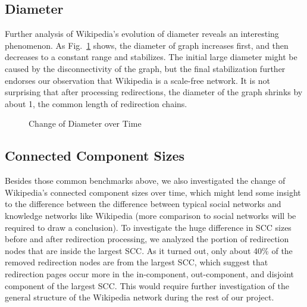 \documentclass[10pt]{article}
\begin{document}
\begin{multicols}{2}
\subsection{Diameter}
Further analysis of Wikipedia's evolution of diameter reveals an interesting phenomenon. As Fig.~\ref{fig:diameter} shows, the diameter of graph increases first, and then decreases to a constant range and stabilizes. The initial large diameter might be caused by the disconnectivity of the graph, but the final stabilization further endorses our observation that Wikipedia is a scale-free network. It is not surprising that after processing redirections, the diameter of the graph shrinks by about 1, the common length of redirection chains.

\begin{figure}[H]
\caption{Change of Diameter over Time\label{fig:diameter}}
\end{figure}

\subsection{Connected Component Sizes}
Besides those common benchmarks above, we also investigated the change of Wikipedia's connected component sizes over time, which might lend some insight to the difference between the difference between typical social networks and knowledge networks like Wikipedia (more comparison to social networks will be required to draw a conclusion). To investigate the huge difference in SCC sizes before and after redirection processing, we analyzed the portion of redirection nodes that are inside the largest SCC. As it turned out, only about 40\% of the removed redirection nodes are from the largest SCC, which suggest that redirection pages occur more in the in-component, out-component, and disjoint component of the largest SCC. This would require further investigation of the general structure of the Wikipedia network during the rest of our project.


\end{multicols}
\end{document}
